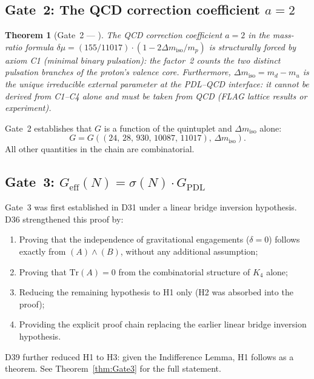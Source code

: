 \documentclass[11pt,a4paper]{article}
\theoremstyle{plain}
\newtheorem{theorem}{Theorem}[section]
\theoremstyle{definition}
\theoremstyle{remark}
\newcommand{\Kfour}{K_4}
\newcommand{\quintuplet}{(24,\,28,\,930,\,10087,\,11017)}
\newcommand{\Geff}{G_{\mathrm{eff}}}
\newcommand{\GPDL}{G_{\mathrm{PDL}}}
\newcommand{\sigmaN}{\sigma(N)}
\begin{document}
\subsection{Gate~2: The QCD correction coefficient \texorpdfstring{$a=2$}{a=2}}
\label{subsec:gate2}

\begin{theorem}[Gate~2 — \citep{D30}]
\label{thm:Gate2}
The QCD correction coefficient $a=2$ in the mass-ratio formula $\delta\mu = (155/11017)\cdot(1-2\Delta m_{\mathrm{iso}}/m_p)$ is structurally forced by axiom C1 (minimal binary pulsation): the factor~2 counts the two distinct pulsation branches of the proton's valence core.
Furthermore, $\Delta m_{\mathrm{iso}} = m_d - m_u$ is the unique irreducible external parameter at the PDL--QCD interface: it cannot be derived from C1--C4 alone and must be taken from QCD (FLAG lattice results or experiment).
\end{theorem}

Gate~2 establishes that $G$ is a function of the quintuplet and $\Delta m_{\mathrm{iso}}$ alone:
\[
G = G(\quintuplet,\, \Delta m_{\mathrm{iso}}).
\]
All other quantities in the chain are combinatorial.

\subsection{Gate~3: \texorpdfstring{$\Geff(N) = \sigmaN \cdot \GPDL$}{Geff(N) = sigmaN . GPDL}}
\label{subsec:gate3}

Gate~3 was first established in D31 under a linear bridge inversion hypothesis.
D36 strengthened this proof by:
\begin{enumerate}
\item Proving that the independence of gravitational engagements ($\delta=0$) follows exactly from $(A)\wedge(B)$, without any additional assumption;
\item Proving that $\mathrm{Tr}(A)=0$ from the combinatorial structure of $\Kfour$ alone;
\item Reducing the remaining hypothesis to H1 only (H2 was absorbed into the proof);
\item Providing the explicit proof chain replacing the earlier linear bridge inversion hypothesis.
\end{enumerate}
D39 further reduced H1 to H3: given the Indifference Lemma, H1 follows as a theorem.
See Theorem~\ref{thm:Gate3} for the full statement.

\end{document}
